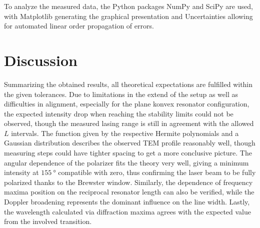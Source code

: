 To analyze the measured data, the Python \cite{python} packages NumPy \cite{numpy} and SciPy \cite{scipy} are used, with Matplotlib
\cite{matplotlib} generating the graphical presentation and Uncertainties \cite{uncertainties} allowing for automated linear order
propagation of errors.



\section{Discussion}

Summarizing the obtained results, all theoretical expectations are fulfilled within the given tolerances. Due to limitations in the extend
of the setup as well as difficulties in alignment, especially for the plane konvex resonator configuration, the expected intensity drop when
reaching the stability limits could not be observed, though the measured lasing range is still in agreement with the allowed $L$ intervals.
The function given by the respective Hermite polynomials and a Gaussian distribution describes the observed TEM profile reasonably well,
though measuring steps could have tighter spacing to get a more conclusive picture. The angular dependence of the polarizer fits the theory
very well, giving a minimum intensity at $\qty{155}{\degree}$ compatible with zero, thus confirming the laser beam to be fully polarized thanks
to the Brewster window. Similarly, the dependence of frequency maxima position on the reciprocal resonator length can also be verified, while
the Doppler broadening represents the dominant influence on the line width. Lastly, the wavelength calculated via diffraction maxima agrees
with the expected value from the involved transition.
